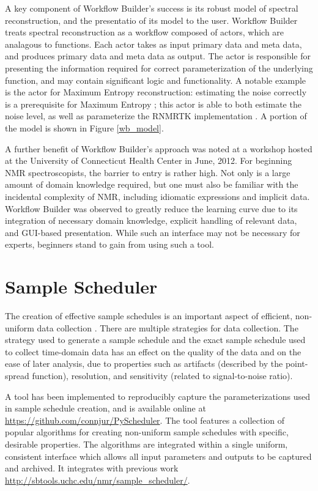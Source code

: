A key component of Workflow Builder's success is its robust model of spectral
reconstruction, and the presentatio of its model to the user.  Workflow Builder
treats spectral reconstruction as a workflow composed of actors, which are
analagous to functions.  Each actor takes as input primary data and meta data,
and produces primary data and meta data as output.  The actor is responsible
for presenting the information required for correct parameterization of the
underlying function, and may contain significant logic and functionality.  A
notable example is the actor for Maximum Entropy reconstruction:  estimating
the noise correctly is a prerequisite for Maximum Entropy \cite{mobli2010non};
this actor is able to both estimate the noise level, as well as parameterize
the RNMRTK implementation \cite{rnmrtk}.  A portion of the model is shown
in Figure \ref{wb_model}.

A further benefit of Workflow Builder's approach was noted at a workshop
hosted at the University of Connecticut Health Center in June, 2012.  For
beginning NMR spectroscopists, the barrier to entry is rather high.  Not only
is a large amount of domain knowledge required, but one must also be familiar
with the incidental complexity of NMR, including idiomatic expressions and
implicit data.  Workflow Builder was observed to greatly reduce the learning
curve due to its integration of necessary domain knowledge, explicit handling
of relevant data, and GUI-based presentation.  While such an interface may 
not be necessary for experts, beginners stand to gain from using such a 
tool.


\section{Sample Scheduler}
The creation of effective sample schedules is an important aspect of efficient,
non-uniform data collection 
\cite{maciejewski2011random, rovnyak2004accelerated, mobli2010non}.  There
are multiple strategies for data collection.  The strategy used to generate
a sample schedule and the exact sample schedule used to collect time-domain
data has an effect on the quality of the data and on the ease of later 
analysis, due to properties such as artifacts (described by the point-spread
function), resolution, and sensitivity (related to signal-to-noise ratio).

A tool has been implemented to reproducibly capture the parameterizations
used in sample schedule creation, and is available online at
\url{https://github.com/connjur/PyScheduler}.  The tool features a 
collection of popular algorithms for creating non-uniform sample schedules
with specific, desirable properties.  The algorithms are integrated within
a single uniform, consistent interface which allows all input parameters
and outputs to be captured and archived.  It integrates with previous work
 \url{http://sbtools.uchc.edu/nmr/sample_scheduler/}.

